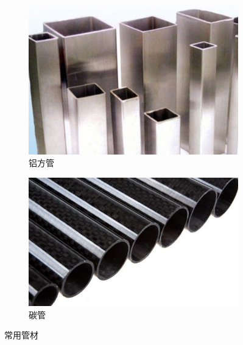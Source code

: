 \documentclass[UTF8]{article} %
\begin{document}
\begin{figure}[H]
  \centering
  \begin{subfigure}[b]{0.39\textwidth}
         \centering
         \includegraphics[width=\textwidth]{lv.png}
          \caption{铝方管}
          \label{f4}
  \end{subfigure}
  \quad
  \begin{subfigure}[b]{0.4\textwidth}
          \centering
          \includegraphics[width=\textwidth]{tan.png}
          \caption{碳管}
          \label{f5}
  \end{subfigure}
  \caption{常用管材 }
  \label{wg}
\end{figure}
\end{document}
